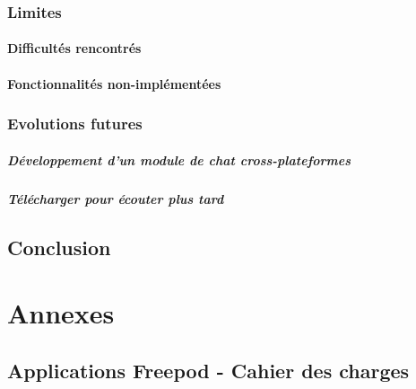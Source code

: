 \documentclass[11pt, french]{report}
\begin{document}
\section{Limites}

\subsection{Difficultés rencontrés}



\subsection{Fonctionnalités non-implémentées}


\section{Evolutions futures}

\subsubsection{Développement d'un module de chat cross-plateformes}

\subsubsection{Télécharger pour écouter plus tard}


\chapter*{Conclusion}



 

\part*{Annexes}

\appendix

\chapter{Applications Freepod - Cahier des charges}
\end{document}
